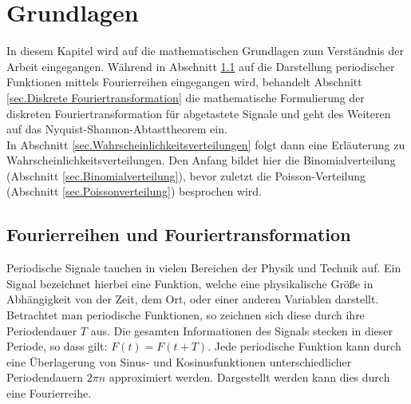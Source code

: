 \chapter{Grundlagen}
In diesem Kapitel wird auf die mathematischen Grundlagen zum Verständnis der Arbeit eingegangen. Während in Abschnitt \ref{sec:Fourierreihen und Fouriertransformation} auf die Darstellung periodischer Funktionen mittels Fourierreihen eingegangen wird, behandelt Abschnitt \ref{sec.Diskrete Fouriertransformation} die mathematische Formulierung der diskreten Fouriertransformation für abgetastete Signale und geht des Weiteren auf das Nyquist-Shannon-Abtasttheorem ein.\\
In Abschnitt \ref{sec.Wahrscheinlichkeitsverteilungen} folgt dann eine Erläuterung zu Wahrscheinlichkeitsverteilungen. Den Anfang bildet hier die Binomialverteilung (Abschnitt \ref{sec.Binomialverteilung}), bevor zuletzt die Poisson-Verteilung (Abschnitt \ref{sec.Poissonverteilung}) besprochen wird.

\section{Fourierreihen und Fouriertransformation}
\label{sec:Fourierreihen und Fouriertransformation}
Periodische Signale tauchen in vielen Bereichen der Physik und Technik auf. Ein Signal bezeichnet hierbei eine Funktion, welche eine physikalische Größe in Abhängigkeit von der Zeit, dem Ort, oder einer anderen Variablen darstellt. Betrachtet man periodische Funktionen, so zeichnen sich diese durch ihre Periodendauer $T$ aus. Die gesamten Informationen des Signals stecken in dieser Periode, so dass gilt: $F(t) = F(t+T)$. Jede periodische Funktion kann durch eine Überlagerung von Sinus- und Kosinusfunktionen unterschiedlicher Periodendauern $2 \pi n$ approximiert werden. Dargestellt werden kann dies durch eine Fourierreihe. 

